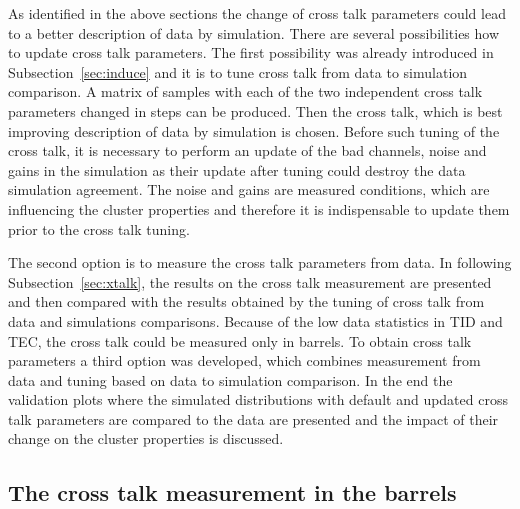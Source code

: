 As identified in the above sections the change of cross talk parameters could lead to a better description of data by simulation. There are several possibilities how to update cross talk parameters. The first possibility was already introduced in Subsection~\ref{sec:induce} and it is to tune cross talk from data to simulation comparison. A matrix of samples with each of the two independent cross talk parameters changed in steps can be produced. Then the cross talk, which is best improving description of data by simulation is chosen. Before such tuning of the cross talk, it is necessary to perform an update of the bad channels, noise and gains in the simulation as their update after tuning could destroy the data simulation agreement. The noise and gains are measured conditions, which are influencing the cluster properties and therefore it is indispensable to update them prior to the cross talk tuning.


The second option is to measure the cross talk parameters from data. In following Subsection~\ref{sec:xtalk}, the results on the cross talk measurement are presented and then compared with the results obtained by the tuning of cross talk from data and simulations comparisons. Because of the low data statistics in TID and TEC, the cross talk could be measured only in barrels. To obtain cross talk parameters a third option was developed, which combines measurement from data and tuning based on data to simulation comparison. In the end the validation plots where the simulated distributions with default and updated cross talk parameters are compared to the data are presented and the impact of their change on the cluster properties is discussed. 

\subsection{The cross talk  measurement in the barrels}

